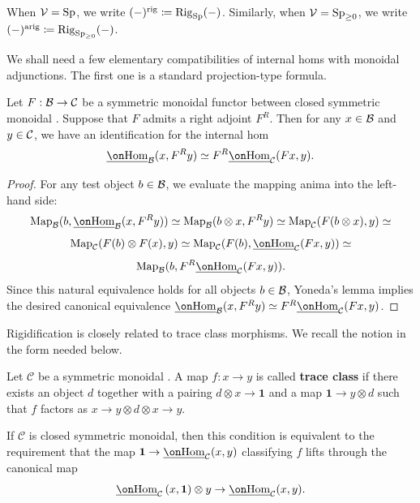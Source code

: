 \documentclass[a4paper,10pt, oneside]{amsart}
\begin{document}
\begin{nota}
	When $\mathcal{V} = \mathrm{Sp}$, we write $(-)^{\mathrm{rig}} \coloneq \mathrm{Rig}_{\mathrm{Sp}}(-)$. Similarly, when $\mathcal{V} = \operatorname{Sp}_{\geq0}$, we write $(-)^{\mathrm{arig}} \coloneq \mathrm{Rig}_{\operatorname{Sp}_{\geq0}}(-)$.
\end{nota}
	We shall need a few elementary compatibilities of internal homs with monoidal adjunctions. The first one is a standard projection-type formula.
	\begin{lem}\label{internalhom1}
		Let $F:\mathcal{B}\to\mathcal{C}$ be a  symmetric monoidal functor between closed symmetric monoidal  \infcats. Suppose that $F$ admits a  right adjoint $F^R$. Then for any $x\in \mathcal{B}$ and $y\in \mathcal{C}$, we have an identification for the internal hom $$\underline{\Hom}_{\mcb}(x,F^Ry)\simeq F^R\underline{\Hom}_{\mcc}(Fx,y).$$
	\end{lem}
	\begin{proof}
		For any test object $b \in \mathcal{B}$, we evaluate the mapping anima into the left-hand side:
		$$ \operatorname{Map}_{\mcb}(b, \underline{\Hom}_{\mcb}(x,F^Ry)) \simeq \operatorname{Map}_{\mcb}(b \otimes x, F^Ry) \simeq \operatorname{Map}_{\mcc}(F(b \otimes x), y) \simeq$$
		$$  \operatorname{Map}_{\mcc}(F(b) \otimes F(x), y) \simeq \operatorname{Map}_{\mcc}(F(b), \underline{\Hom}_{\mcc}(Fx, y)) \simeq$$
		$$  \operatorname{Map}_{\mcb}(b, F^R\underline{\Hom}_{\mcc}(Fx, y)). $$
		Since this natural equivalence holds for all objects $b \in \mathcal{B}$, Yoneda's lemma implies the desired canonical equivalence $\underline{\Hom}_{\mcb}(x,F^Ry) \simeq F^R\underline{\Hom}_{\mcc}(Fx,y)$.
	\end{proof}
	Rigidification is closely related to trace class morphisms. We recall the notion in the form needed below.
	\begin{de}
	Let $\mathcal{C}$ be a symmetric monoidal \infcat. A map $f: x \rightarrow y$ is called \textbf{trace class} if there exists an object $d$ together with a pairing $d \otimes x \rightarrow \mathbf{1}$ and a map $\mathbf{1} \rightarrow y \otimes d$ such that $f$ factors as $x \rightarrow y \otimes d \otimes x \rightarrow y$.
		
	
		
	\end{de}
	\begin{rem}
		If $\mathcal{C}$ is closed symmetric monoidal, then this condition is equivalent to the requirement that the map $\mathbf{1} \rightarrow 	\underline{\Hom}_{\mathcal{C}}(x, y)$ classifying $f$ lifts through the canonical map
		$$
		\underline{\Hom}_{\mathcal{C}}\left(x, \mathbf{1}\right) \otimes y \rightarrow \underline{\Hom}_{\mathcal{C}}(x, y).
		$$
	\end{rem}
\end{document}
